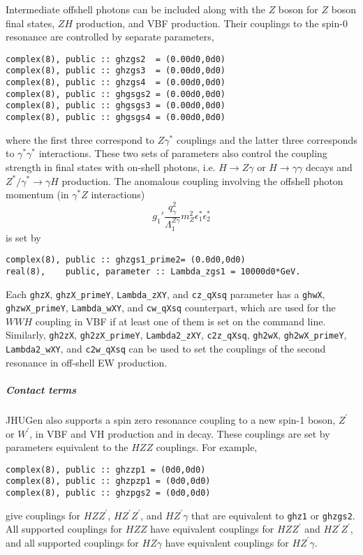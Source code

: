 \documentclass[aps,superscriptaddress,nofootinbib]{revtex4}
\begin{document}
Intermediate offshell photons can be included along with the $Z$ boson for $Z$ boson final states, $ZH$ production, and VBF production.
Their couplings to the spin-0 resonance are controlled by separate parameters,
\begin{verbatim}
complex(8), public :: ghzgs2  = (0.00d0,0d0)
complex(8), public :: ghzgs3  = (0.00d0,0d0)
complex(8), public :: ghzgs4  = (0.00d0,0d0)
complex(8), public :: ghgsgs2 = (0.00d0,0d0)
complex(8), public :: ghgsgs3 = (0.00d0,0d0)
complex(8), public :: ghgsgs4 = (0.00d0,0d0)
\end{verbatim}
where the first three correspond to $Z\gamma^*$ couplings and the latter three corresponds to $\gamma^* \gamma^*$ interactions.
These two sets of parameters also control the coupling strength in final states with on-shell photons, i.e. $H\to Z\gamma$ or $H\to \gamma\gamma$ decays and $Z^*/\gamma^*\to\gamma H$ production.
The anomalous coupling involving the offshell photon momentum (in $\gamma^* Z$ interactions)
\[
g_1' \frac{ q^2_\gamma }{ \Lambda_1^{Z\gamma} } m_Z^2 \epsilon^*_1 \epsilon^*_2
\]
is set by
\begin{verbatim}
complex(8), public :: ghzgs1_prime2= (0.0d0,0d0)
real(8),    public, parameter :: Lambda_zgs1 = 10000d0*GeV.
\end{verbatim}

Each \verb|ghzX|, \verb|ghzX_primeY|, \verb|Lambda_zXY|, and \verb|cz_qXsq| parameter has a \verb|ghwX|, \verb|ghzwX_primeY|, \verb|Lambda_wXY|, and \verb|cw_qXsq| counterpart, which are used for the $WWH$ coupling in VBF if at least one of them is set on the command line.  Similarly, \verb|gh2zX|, \verb|gh2zX_primeY|, \verb|Lambda2_zXY|, \verb|c2z_qXsq|, \verb|gh2wX|, \verb|gh2wX_primeY|, \verb|Lambda2_wXY|, and \verb|c2w_qXsq| can be used to set the couplings of the second resonance in off-shell EW production.

\subparagraph{Contact terms}
\label{contactterms}

JHUGen also supports a spin zero resonance coupling to a new spin-1 boson, $Z^\prime$ or $W^\prime$, in VBF and VH production and in decay.
These couplings are set by parameters equivalent to the $HZZ$ couplings.  For example,
\begin{verbatim}
complex(8), public :: ghzzp1 = (0d0,0d0)
complex(8), public :: ghzpzp1 = (0d0,0d0)
complex(8), public :: ghzpgs2 = (0d0,0d0)
\end{verbatim}
give couplings for $HZZ^\prime$, $HZ^\prime Z^\prime$, and $HZ^\prime\gamma$ that are equivalent to \verb|ghz1| or \verb|ghzgs2|.  All supported couplings for $HZZ$ have equivalent couplings for $HZZ^\prime$ and $HZ^\prime Z^\prime$, and all supported couplings for $HZ\gamma$ have equivalent couplings for $HZ^\prime\gamma$.
\end{document}
